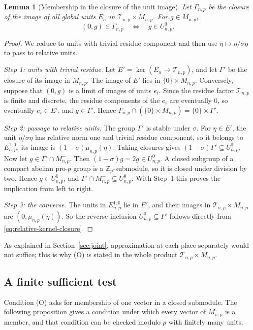 \documentclass[11pt]{article}
\theoremstyle{plain}
\newtheorem{lemma}[theorem]{Lemma}
\theoremstyle{definition}
\theoremstyle{remark}
\newcommand{\Z}{\mathbb Z}
\begin{document}
\begin{lemma}[Membership in the closure of the unit image]\label{lem:odd-membership}
Let $\Gamma_{n,p}$ be the closure of the image of all global units $E_n$
in $\mathcal T_{n,p}\times M_{n,p}$.  For $g\in M_{n,p}^-$,
\[
 (0,g)\in\Gamma_{n,p}\quad\Longleftrightarrow\quad g\in U_{n,p}^0.
\]
\end{lemma}
\begin{proof}
We reduce to units with trivial residue component and then use
$\eta\mapsto\eta/\sigma\eta$ to pass to relative units.

\emph{Step 1: units with trivial residue.}  Let
$E'=\ker(E_n\to\mathcal T_{n,p})$, and let $\Gamma'$ be the closure of its
image in $M_{n,p}$.  The image of $E'$ lies in $\{0\}\times M_{n,p}$.
Conversely, suppose that $(0,g)$ is a limit of images of units $e_i$.
Since the residue factor $\mathcal T_{n,p}$ is finite and discrete, the
residue components of the $e_i$ are eventually $0$, so eventually
$e_i\in E'$, and $g\in\Gamma'$.  Hence
$\Gamma_{n,p}\cap(\{0\}\times M_{n,p})=\{0\}\times\Gamma'$.

\emph{Step 2: passage to relative units.}  The group $\Gamma'$ is stable
under $\sigma$.  For $\eta\in E'$, the unit $\eta/\sigma\eta$ has
relative norm one and trivial residue component, so it belongs to
$E_{n,p}^{1,0}$; its image is $(1-\sigma)\mu_{n,p}(\eta)$.  Taking
closures gives $(1-\sigma)\Gamma'\subseteq U_{n,p}^0$.  Now let
$g\in\Gamma'\cap M_{n,p}^-$.  Then $(1-\sigma)g=2g\in U_{n,p}^0$.  A
closed subgroup of a compact abelian pro-$p$ group is a
$\Z_p$-submodule, so it is closed under division by two.  Hence $g\in
U_{n,p}^0$, and $\Gamma'\cap M_{n,p}^-\subseteq U_{n,p}^0$.  With Step~1
this proves the implication from left to right.

\emph{Step 3: the converse.}  The units in $E_{n,p}^{1,0}$ lie in $E'$,
and their images in $\mathcal T_{n,p}\times M_{n,p}$ are
$(0,\mu_{n,p}(\eta))$.  So the reverse inclusion
$U_{n,p}^0\subseteq\Gamma'$ follows directly from
\eqref{eq:relative-kernel-closure}.
\end{proof}

As explained in Section~\ref{sec:joint}, approximation at each place
separately would not suffice; this is why (O) is stated in the whole
product $\mathcal T_{n,p}\times M_{n,p}$.

\subsection{A finite sufficient test}\label{sec:odd-certificate}
Condition (O) asks for membership of one vector in a closed submodule.
The following proposition gives a condition under which every vector of
$M_{n,p}^-$ is a member, and that condition can be checked modulo $p$ with
finitely many units.
\end{document}

